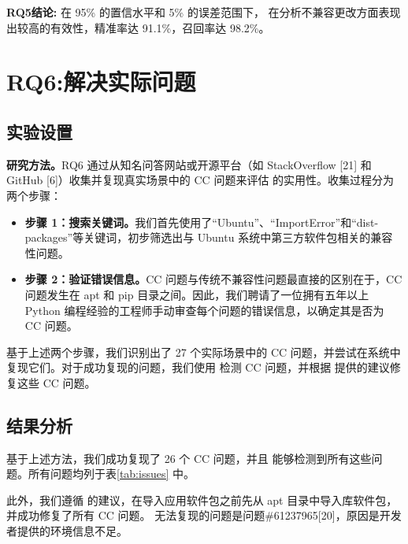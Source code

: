 \begin{tcolorbox}[boxrule=1pt,boxsep=1pt,left=2pt,right=2pt,top=2pt,bottom=2pt]
	\small
	\textcolor{red}{} \noindent\textbf{RQ5结论:} 
	在 95\% 的置信水平和 5\% 的误差范围下，\tool{} 在分析不兼容更改方面表现出较高的有效性，精准率达 91.1\%，召回率达 98.2\%。
\end{tcolorbox} 

\section{RQ6:解决实际问题}
\subsection{实验设置}
\textbf{研究方法。}RQ6 通过从知名问答网站或开源平台（如 StackOverflow [21] 和 GitHub [6]）收集并复现真实场景中的 CC 问题来评估 \tool{} 的实用性。收集过程分为两个步骤：
\begin{itemize}
	\item \textbf{步骤 1：搜索关键词。}我们首先使用了“Ubuntu”、“ImportError”和“dist-packages”等关键词，初步筛选出与 Ubuntu 系统中第三方软件包相关的兼容性问题。
	\item \textbf{步骤 2：验证错误信息。}CC 问题与传统不兼容性问题最直接的区别在于，CC 问题发生在 apt 和 pip 目录之间。因此，我们聘请了一位拥有五年以上 Python 编程经验的工程师手动审查每个问题的错误信息，以确定其是否为 CC 问题。
\end{itemize}
基于上述两个步骤，我们识别出了 27 个实际场景中的 CC 问题，并尝试在系统中复现它们。对于成功复现的问题，我们使用 \tool{} 检测 CC 问题，并根据 \tool{} 提供的建议修复这些 CC 问题。
\subsection{结果分析}
基于上述方法，我们成功复现了 26 个 CC 问题，并且 \tool{} 能够检测到所有这些问题。所有问题均列于表\ref{tab:issues} 中。

此外，我们遵循\tool{} 的建议，在导入应用软件包之前先从 apt 目录中导入库软件包，并成功修复了所有 CC 问题。
无法复现的问题是问题\#61237965[20]，原因是开发者提供的环境信息不足。

